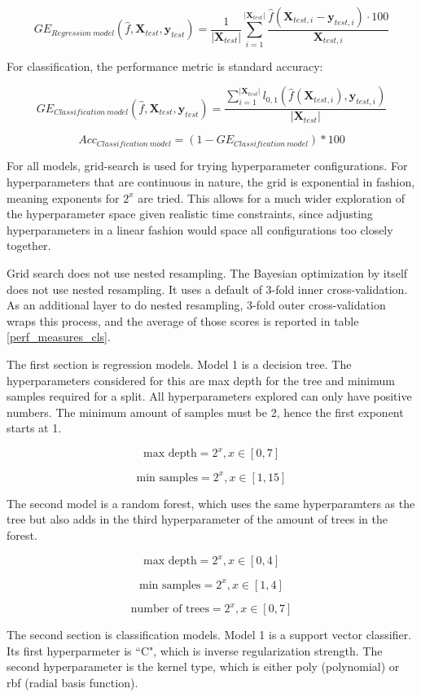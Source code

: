 \documentclass[12pt, letterpaper]{article}
\begin{document}
$$
    GE_{Regression\ model}(\hat{f}, \bm{X}_{test}, \bm{y}_{test}) = \frac{1}{|\bm{X}_{test}|} \sum_{i=1}^{|\bm{X}_{test}|} \frac{\hat{f}(\bm{X}_{test,i} - \bm{y}_{test,i}) \cdot 100}{\bm{X}_{test,i}}
$$

For classification, the performance metric is standard accuracy:

$$
    GE_{Classification\ model}(\hat{f}, \bm{X}_{test}, \bm{y}_{test}) = \frac{\sum_{i=1}^{|\bm{X}_{test}|}l_{0,1}(\hat{f}(\bm{X}_{test,i}), \bm{y}_{test,i})}{|\bm{X}_{test}|}
$$

$$
Acc_{Classification\ model} = (1 - GE_{Classification\ model}) * 100
$$

For all models, grid-search is used for trying hyperparameter configurations. For hyperparameters that are continuous in nature, the grid is exponential in fashion, meaning exponents for $2^x$ are tried. This allows for a much wider exploration of the hyperparameter space given realistic time constraints, since adjusting hyperparameters in a linear fashion would space all configurations too closely together.

Grid search does not use nested resampling. The Bayesian optimization by itself does not use nested resampling. It uses a default of 3-fold inner cross-validation. As an additional layer to do nested resampling, 3-fold outer cross-validation wraps this process, and the average of those scores is reported in table \ref{perf_measures_cls}.

The first section is regression models. Model 1 is a decision tree. The hyperparameters considered for this are max depth for the tree and minimum samples required for a split. All hyperparameters explored can only have positive numbers. The minimum amount of samples must be 2, hence the first exponent starts at 1.

$$
\text{max depth} = 2^x, x \in [0,7]
$$

$$
\text{min samples} = 2^x, x \in [1,15]
$$

The second model is a random forest, which uses the same hyperparamters as the tree but also adds in the third hyperparameter of the amount of trees in the forest.

$$
\text{max depth} = 2^x, x \in [0,4]
$$

$$
\text{min samples} = 2^x, x \in [1,4]
$$

$$
\text{number of trees} = 2^x, x \in [0,7]
$$

The second section is classification models. Model 1 is a support vector classifier. Its first hyperparmeter is ``C", which is inverse regularization strength. The second hyperparameter is the kernel type, which is either poly (polynomial) or rbf (radial basis function).
\end{document}
